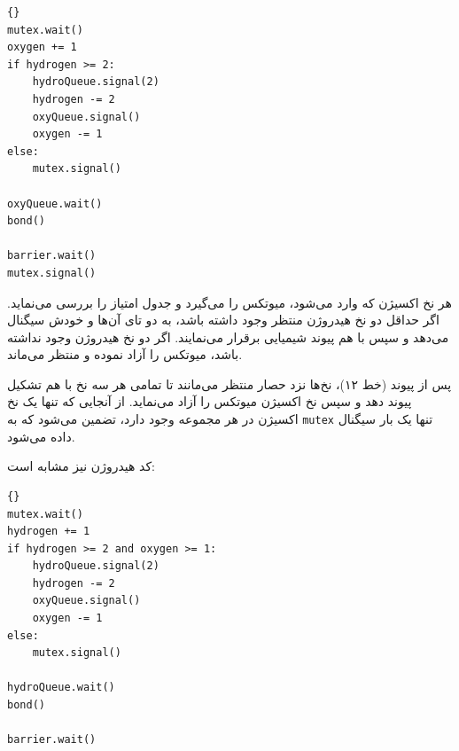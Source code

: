 \documentclass{book}
\begin{document}
\begin{latin}
\begin{latin}
\begin{lstlisting}[title=\rl{ کد اکسیژن}]{}
mutex.wait()
oxygen += 1
if hydrogen >= 2:
    hydroQueue.signal(2)
    hydrogen -= 2
    oxyQueue.signal()
    oxygen -= 1
else:
    mutex.signal()

oxyQueue.wait()
bond()

barrier.wait()
mutex.signal()
\end{lstlisting}
\end{latin}
\end{latin}

    هر نخ اکسیژن که وارد می‌شود، میوتکس را می‌گیرد و جدول امتیاز را بررسی می‌نماید. اگر حداقل دو نخ هیدروژن منتظر وجود داشته باشد، به دو تای آن‌ها و خودش 
    سیگنال می‌دهد و سپس با هم پیوند شیمیایی برقرار می‌نمایند. اگر دو نخ هیدروژن وجود نداشته باشد، میوتکس را آزاد نموده و منتظر می‌ماند. 

    پس از پیوند (خط ۱۲)، نخ‌ها نزد حصار منتظر می‌مانند تا تمامی هر سه نخ با هم تشکیل پیوند دهد و سپس نخ اکسیژن میوتکس را آزاد می‌نماید. 
    از آنجایی که تنها یک نخ اکسیژن در هر مجموعه وجود دارد، تضمین می‌شود که به  {\tt mutex} تنها یک بار سیگنال داده می‌شود. 

    کد هیدروژن نیز مشابه است: 

\begin{latin}
\begin{latin}
\begin{lstlisting}[title=\rl{کد هیدروژن}]{}
mutex.wait()
hydrogen += 1
if hydrogen >= 2 and oxygen >= 1:
    hydroQueue.signal(2)
    hydrogen -= 2
    oxyQueue.signal()
    oxygen -= 1
else:
    mutex.signal()

hydroQueue.wait()
bond()

barrier.wait()
\end{lstlisting}
\end{latin}
\end{latin}
\end{document}
